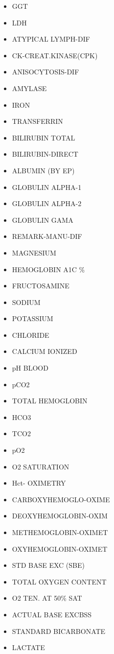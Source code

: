 \documentclass[a4paper,12pt]{article}
\begin{document}
\begin{appendices}
\begin{itemize}
   			\item GGT
   			\item LDH
   			\item ATYPICAL LYMPH-DIF
   			\item CK-CREAT.KINASE(CPK)
   			\item ANISOCYTOSIS-DIF
   			\item AMYLASE
   			\item IRON
   			\item TRANSFERRIN
   			\item BILIRUBIN TOTAL
   			\item BILIRUBIN-DIRECT
   			\item ALBUMIN (BY EP)
   			\item GLOBULIN ALPHA-1
   			\item GLOBULIN ALPHA-2
   			\item GLOBULIN GAMA
   			\item REMARK-MANU-DIF
   			\item MAGNESIUM
   			\item HEMOGLOBIN A1C \%
   			\item FRUCTOSAMINE
   			\item SODIUM
   			\item POTASSIUM
   			\item CHLORIDE
   			\item CALCIUM IONIZED
   			\item pH BLOOD
   			\item pCO2
   			\item TOTAL HEMOGLOBIN
   			\item HCO3
   			\item TCO2
   			\item pO2
   			\item O2 SATURATION
   			\item Hct- OXIMETRY
   			\item CARBOXYHEMOGLO-OXIME
   			\item DEOXYHEMOGLOBIN-OXIM
   			\item METHEMOGLOBIN-OXIMET
   			\item OXYHEMOGLOBIN-OXIMET
   			\item STD BASE EXC (SBE)
   			\item TOTAL OXYGEN CONTENT
   			\item O2 TEN. AT 50\% SAT
   			\item ACTUAL BASE EXCBSS
   			\item STANDARD BICARBONATE
   			\item LACTATE

\end{itemize}
\end{appendices}
\end{document}

